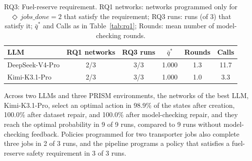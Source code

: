 \begin{table}[t]
  \centering
  \caption{RQ3: Fuel-reserve requirement. RQ1 networks: networks programmed only
    for $\Diamond\, \mathit{jobs\_done} = 2$ that satisfy the requirement; RQ3
    runs: runs (of 3) that satisfy it; $\bar{q}^*$ and Calls as in
    Table~\ref{tab:rq1}; Rounds: mean number of model-checking rounds.}
  \label{tab:rq3}
  \begin{tabular}{lccccc}
    \toprule
    LLM & RQ1 networks & RQ3 runs & $\bar{q}^*$ & Rounds & Calls \\
    \midrule
    DeepSeek-V4-Pro & 2/3 & 3/3 & 1.000 & 1.3 & 11.7 \\
    Kimi-K3.1-Pro & 2/3 & 3/3 & 1.000 & 1.0 & 3.3 \\
    \bottomrule
  \end{tabular}
\end{table}

\begin{table}[t]
  \centering
  \caption{RQ4: Generation errors over all runs of RQ1 and RQ3.}
  \label{tab:rq4}
\end{table}

Across two LLMs and three PRISM environments, the networks of the best LLM,
Kimi-K3.1-Pro, select an optimal action in 98.9\% of the states
after creation, 100.0\% after dataset repair, and 100.0\% after
model-checking repair, and they reach the optimal probability in 9
of 9 runs, compared to 9 runs without model-checking
feedback. Policies programmed for two transporter jobs also complete three jobs
in 2 of 3 runs, and the pipeline programs a policy that
satisfies a fuel-reserve safety requirement in 3 of 3
runs.
